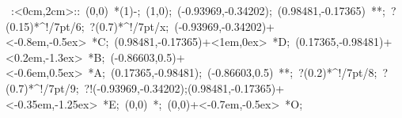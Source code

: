 %


\hbox{
\xy    <2cm,0cm>:<0cm,2cm>::
       (0,0) *\ellipse(1){-}; (1,0); 
       (-0.93969,-0.34202); (0.98481,-0.17365) **\dir{-}; 
       ?(0.15)*^!/7pt/{6};  ?(0.7)*^!/7pt/{x};  
       (-0.93969,-0.34202)+<-0.8em,-0.5ex> *{C}; 
       (0.98481,-0.17365)+<1em,0ex> *{D}; 
       (0.17365,-0.98481)+<0.2em,-1.3ex> *{B}; 
       (-0.86603,0.5)+<-0.6em,0.5ex> *{A}; 
       (0.17365,-0.98481); (-0.86603,0.5) **\dir{-};
       ?(0.2)*^!/7pt/{8};  ?(0.7)*^!/7pt/{9};  
  ?!{(-0.93969,-0.34202);(0.98481,-0.17365)}+<-0.35em,-1.25ex> 
                  *{E};
       (0,0) *{\bullet}; (0,0)+<-0.7em,-0.5ex> *{O};
\endxy}



